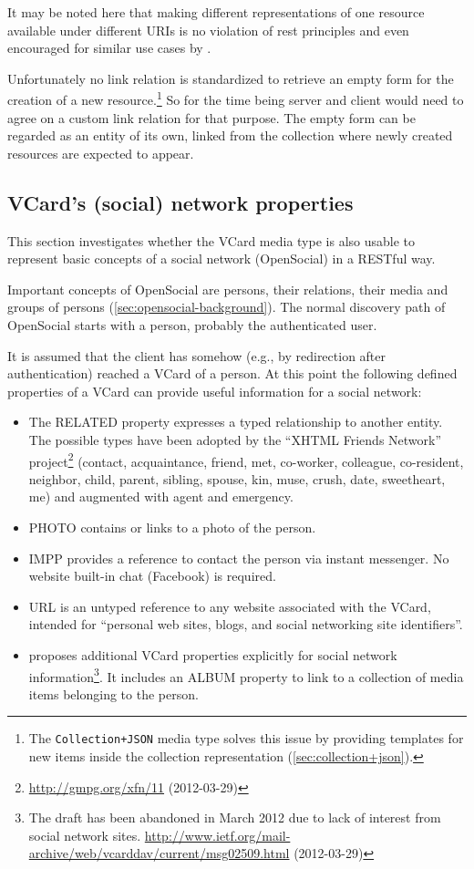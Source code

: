 \documentclass[11pt,a4paper,headsepline,twoside]{scrartcl}		%
\newcommand{\citeurl}[2]{\url{#1} (#2)}
\begin{document}
It may be noted here that making different representations of one resource
available under different URIs is no violation of rest principles and even
encouraged for similar use cases by \cite{Raman2006}.

Unfortunately no link relation is standardized to retrieve an empty form for the
creation of a new resource.\footnote{The \lstinline:Collection+JSON: media type
  solves this issue by providing templates for new items inside the collection
  representation (\autoref{sec:collection+json}).}  So for the time being server
and client would need to agree on a custom link relation for that purpose. The
empty form can be regarded as an entity of its own, linked from the collection
where newly created resources are expected to appear.

\subsection{VCard's (social) network properties}
\label{sec:vcards-soci-netw}

This section investigates whether the VCard media type is also usable to
represent basic concepts of a social network (OpenSocial) in a RESTful way.

Important concepts of OpenSocial are persons, their relations, their media and
groups of persons (\autoref{sec:opensocial-background}). The normal discovery
path of OpenSocial starts with a person, probably the authenticated user.

It is assumed that the client has somehow (e.g., by redirection after
authentication) reached a VCard of a person. At this point the following defined
properties of a VCard can provide useful information for a social network:

\begin{itemize}
\item The RELATED property expresses a typed relationship to another entity. The
  possible types have been adopted by the ``XHTML Friends Network''
  project\footnote{\citeurl{http://gmpg.org/xfn/11}{2012-03-29}} (contact,
  acquaintance, friend, met, co-worker, colleague, co-resident, neighbor, child,
  parent, sibling, spouse, kin, muse, crush, date, sweetheart, me) and augmented
  with agent and emergency.
\item PHOTO contains or links to a photo of the person.
\item IMPP provides a reference to contact the person via instant messenger. No
  website built-in chat (Facebook) is required.
\item URL is an untyped reference to any website associated with the VCard,
  intended for ``personal web sites, blogs, and social networking site
  identifiers''.
\item \cite{George2011} proposes additional VCard properties explicitly for
  social network information\footnote{The draft has been abandoned in March 2012
    due to lack of interest from social network
    sites. \citeurl{http://www.ietf.org/mail-archive/web/vcarddav/current/msg02509.html}{2012-03-29}}. It
  includes an ALBUM property to link to a collection of media items belonging to
  the person.
\end{itemize}
\end{document}
